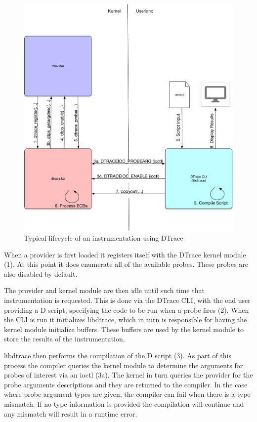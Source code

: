\begin{figure}[htpb]
	\centering
	\includegraphics[width=0.8\linewidth]{dtrace-lifecycle.pdf}
	\caption{Typical lifecycle of an instrumentation using DTrace}
	\label{fig:lifecycle}
\end{figure}

When a provider is first loaded it registers itself with the DTrace kernel module (1). At this point it does enumerate all of the available probes. These probes are also disabled by default.

The provider and kernel module are then idle until such time that instrumentation is requested. This is done via the DTrace CLI, with the end user providing a D script, specifying the code to be run when a probe fires (2). When the CLI is run it initializes libdtrace, which in turn is responsible for having the kernel module initialize buffers. These buffers are used by the kernel module to store the results of the instrumentation.

libdtrace then performs the compilation of the D script (3). As part of this process the compiler queries the kernel module to determine the arguments for probes of interest via an ioctl (3a). The kernel in turn queries the provider for the probe arguments descriptions and they are returned to the compiler. In the case where probe argument types are given, the compiler can fail when there is a type mismatch. If no type information is provided the compilation will continue and any mismatch will result in a runtime error.

